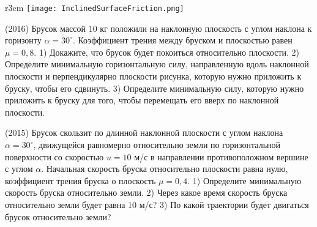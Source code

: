 \begin{wrapfigure}{r}{3cm}
\texttt{[image: InclinedSurfaceFriction.png]}
\end{wrapfigure}
\AddProb (2016) Брусок массой 10 кг положили на наклонную плоскость с углом наклона к горизонту $\alpha = 30^{\circ}$. Коэффициент трения между бруском и плоскостью равен $\mu = 0,8$. 1) Докажите, что брусок будет покоиться относительно плоскости. 2) Определите минимальную горизонтальную силу, направленную вдоль наклонной плоскости и перпендикулярно плоскости рисунка, которую нужно приложить к бруску, чтобы его сдвинуть. 3) Определите минимальную силу‚ которую нужно приложить к бруску для того, чтобы перемещать его вверх по наклонной плоскости.

\AddProb (2015) Брусок скользит по длинной наклонной плоскости с углом наклона $\alpha = 30^{\circ}$, движущейся равномерно относительно земли по горизонтальной поверхности со скоростью $u = 10$ м/с в направлении противоположном вершине с углом $\alpha$. Начальная скорость бруска относительно плоскости равна нулю, коэффициент трения бруска о плоскость $\mu = 0,4$. 1) Определите минимальную скорость бруска относительно земли. 2) Через какое время скорость бруска относительно земли будет равна 10 м/с? 3) По какой траектории будет двигаться брусок относительно земли?
